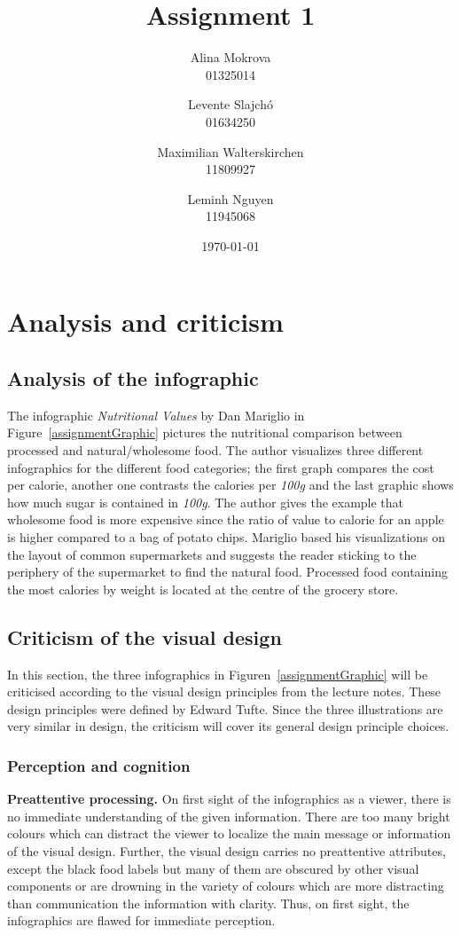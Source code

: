 \documentclass[a4paper, 11pt]{scrartcl}
\title{Assignment 1}
\author{Alina Mokrova\\
				01325014
				\and
				Levente	Slajchó\\
				01634250
				\and
				Maximilian Walterskirchen\\
				11809927
				\and
				Leminh Nguyen\\
				11945068}
\date{\today}
\begin{document}
\maketitle

\section{Analysis and criticism}

\subsection{Analysis of the infographic}

The infographic \textit{Nutritional Values} by Dan Mariglio in
Figure~\ref{assignmentGraphic} pictures the nutritional comparison between
processed and natural/wholesome food. The author visualizes three different
infographics for the different food categories; the first graph compares the
cost per calorie, another one contrasts the calories per \textit{100g} and the
last graphic shows how much sugar is contained in \textit{100g}. The author
gives the example that wholesome food is more expensive since the ratio of value
to calorie for an apple is higher compared to a bag of potato chips. Mariglio
based his visualizations on the layout of common supermarkets and suggests the
reader sticking to the periphery of the supermarket to find the natural food.
Processed food containing the most calories by weight is located at the centre
of the grocery store.

\subsection{Criticism of the visual design}

In this section, the three infographics in Figuren~\ref{assignmentGraphic} will
be criticised according to the visual design principles from the lecture notes.
These design principles were defined by Edward Tufte\cite{Tufte2001}. Since the
three illustrations are very similar in design, the criticism will cover its
general design principle choices.

\subsubsection{Perception and cognition}

\textbf{Preattentive processing.} On first sight of the infographics as a
viewer, there is no immediate understanding of the given information. There are
too many bright colours which can distract the viewer to localize the main
message or information of the visual design. Further, the visual design carries
no preattentive attributes, except the black food labels but many of them are
obscured by other visual components or are drowning in the variety of colours
which are more distracting than communication the information with clarity.
Thus, on first sight, the infographics are flawed for immediate perception.
\end{document}
